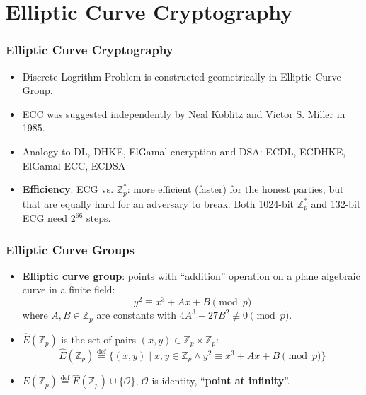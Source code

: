\section{Elliptic Curve Cryptography}
\begin{frame}\frametitle{Elliptic Curve Cryptography}
\begin{itemize}
\item Discrete Logrithm Problem is constructed geometrically in Elliptic Curve Group.
\item ECC was suggested independently by Neal Koblitz and Victor S. Miller in 1985.
\item Analogy to DL, DHKE, ElGamal encryption and DSA: ECDL, ECDHKE, ElGamal ECC, ECDSA
\item \textbf{Efficiency}: ECG vs. $\mathbb{Z}_p^*$: more efficient (faster) for the honest parties, but that are equally hard for an adversary to break.
Both 1024-bit $\mathbb{Z}_p^*$ and 132-bit ECG need $2^{66}$ steps.
\end{itemize}
\end{frame}
\begin{frame}\frametitle{Elliptic Curve Groups}
    \begin{itemize}
    \item \textbf{Elliptic curve group}: points with ``addition'' operation on a plane algebraic curve in a finite field:
    \[ y^2 \equiv x^3 + Ax + B \pmod p\]
    where $A,B \in \mathbb{Z}_p$ are constants with $4A^3 + 27B^2\not \equiv 0 \pmod p$.
    \item $\hat{E}(\mathbb{Z}_p)$ is the set of pairs $(x,y) \in \mathbb{Z}_p \times \mathbb{Z}_p$:
    \[ \hat{E}(\mathbb{Z}_p) \overset{\text{def}}{=} \{(x,y) \mid x,y\in \mathbb{Z}_p \land y^2 \equiv x^3 + Ax + B \pmod p \}\]
    \item $E(\mathbb{Z}_p) \overset{\text{def}}{=} \hat{E}(\mathbb{Z}_p)\cup \{\mathcal{O}\}$, $\mathcal{O}$ is identity, ``\textbf{point at infinity}''.
    \end{itemize}
\end{frame}
